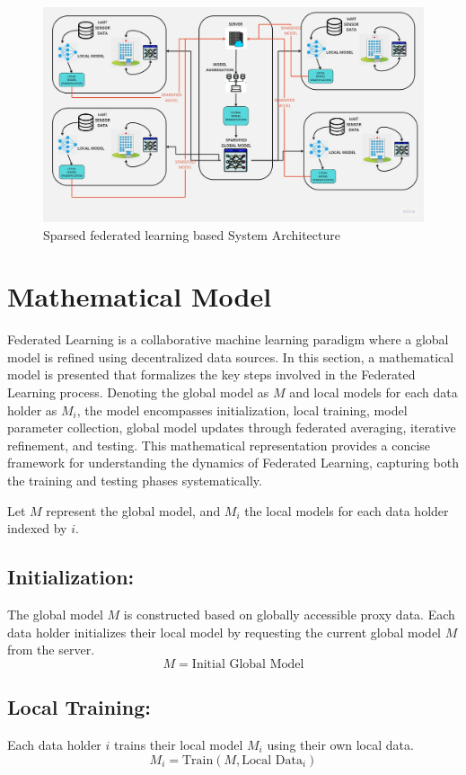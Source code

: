 \documentclass[conference]{IEEEtran}
\begin{document}
\begin{figure}[htp]
    \centering
    \includegraphics[scale = 0.14]{FL_ARCHITECTURE.jpg}
    \caption{Sparsed federated learning based System Architecture}
    \label{ds}
\end{figure}

\section{Mathematical Model}
Federated Learning is a collaborative machine learning paradigm where a global model is refined using decentralized data sources. In this section, a mathematical model is presented that formalizes the key steps involved in the Federated Learning process. Denoting the global model as \(M\) and local models for each data holder as \(M_i\), the model encompasses initialization, local training, model parameter collection, global model updates through federated averaging, iterative refinement, and testing. This mathematical representation provides a concise framework for understanding the dynamics of Federated Learning, capturing both the training and testing phases systematically.

Let \(M\) represent the global model, and \(M_i\) the local models for each data holder indexed by \(i\).

\subsection{Initialization:}
The global model \(M\) is constructed based on globally accessible proxy data. Each data holder initializes their local model by requesting the current global model \(M\) from the server.
\[ M = \text{Initial Global Model} \]
\subsection{Local Training:}
Each data holder \(i\) trains their local model \(M_i\) using their own local data.
\[ M_i = \text{Train}(M, \text{Local Data}_i) \]
\end{document}
